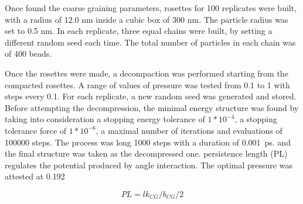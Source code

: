 



Once found the coarse graining parameters, rosettes for 100 replicates were built, with a radius of 12.0 nm inside a cubic box of 300 nm. The particle radius was set to 0.5 nm. In each replicate, three equal chains were built, by setting a different random seed each time. The total number of particles in each chain was of 400 beads.



Once the rosettes were made, a decompaction was performed starting from the compacted rosettes. A range of values of pressure was tested from 0.1 to 1 with steps every 0.1. For each replicate, a new random seed was generated and stored.
Before attempting the decompression, the minimal energy structure was found by taking into consideration a stopping energy tolerance of $1*10^{-4}$, a stopping tolerance force of $1*10^{-6}$, a maximal number of iterations and evaluations of 100000 steps. %
The process was long 1000 steps with a duration of \SI{0.001}{\pico\second}.
and the final structure was taken as the decompressed one.
persistence length (PL) regulates the potential produced by angle interaction.
The optimal pressure was attested at 0.192 %


\begin{equation} \label{eq: persistence length}
    PL = lk_{CG} / b_{CG} / 2
\end{equation}




